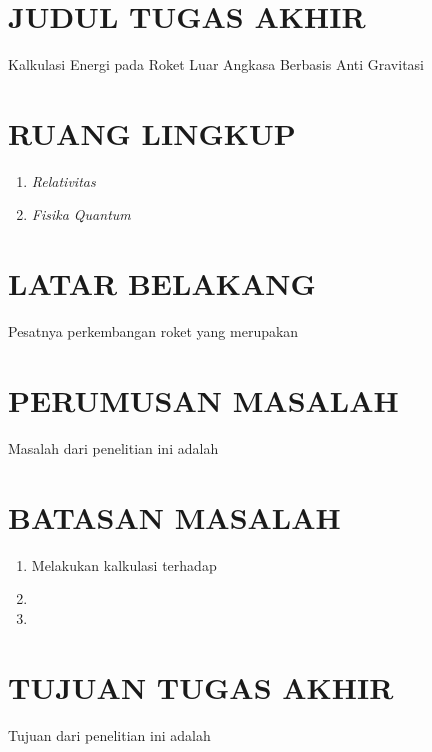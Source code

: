 \section{JUDUL TUGAS AKHIR}

Kalkulasi Energi pada Roket Luar Angkasa Berbasis Anti Gravitasi

\section{RUANG LINGKUP}

\begin{enumerate}[nolistsep]
  \item \textit{Relativitas}
  \item \textit{Fisika Quantum}
\end{enumerate}

\section{LATAR BELAKANG}

Pesatnya perkembangan roket yang merupakan \lipsum[1]

\lipsum[2]

\lipsum[3][1-10]

\section{PERUMUSAN MASALAH}

Masalah dari penelitian ini adalah \lipsum[1][1-6]

\section{BATASAN MASALAH}

\begin{enumerate}[nolistsep]
  \item Melakukan kalkulasi terhadap \lipsum[1][1]
  \item \lipsum[1][2]
  \item \lipsum[1][3]
\end{enumerate}

\section{TUJUAN TUGAS AKHIR}

Tujuan dari penelitian ini adalah \lipsum[1][1-6]